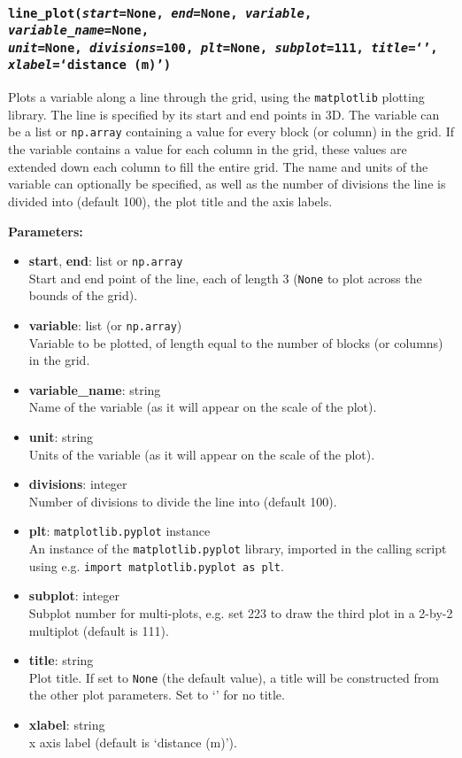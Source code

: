 \subsubsection{\texttt{line\_plot(\emph{start}=None, \emph{end}=None, \emph{variable}, \emph{variable\_name}=None,\\
\emph{unit}=None, \emph{divisions}=100, \emph{plt}=None, \emph{subplot}=111, \emph{title}=`',\\
\emph{xlabel}=`distance (m)')}}

Plots a variable along a line through the grid, using the \texttt{matplotlib} plotting library. The line is specified by its start and end points in 3D.  The variable can be a list or \texttt{np.array} containing a value for every block (or column) in the grid.  If the variable contains a value for each column in the grid, these values are extended down each column to fill the entire grid.  The name and units of the variable can optionally be specified, as well as the number of divisions the line is divided into (default 100), the plot title and the axis labels.

\textbf{Parameters:}
\begin{itemize}
\item \textbf{start}, \textbf{end}: list or \texttt{np.array}\\
  Start and end point of the line, each of length 3 (\texttt{None} to plot across the bounds of the grid).
\item \textbf{variable}: list (or \texttt{np.array})\\
  Variable to be plotted, of length equal to the number of blocks (or columns) in the grid.
\item \textbf{variable\_name}: string\\
  Name of the variable (as it will appear on the scale of the plot).
\item \textbf{unit}: string\\
  Units of the variable (as it will appear on the scale of the plot).
\item \textbf{divisions}: integer\\
  Number of divisions to divide the line into (default 100).
\item \textbf{plt}: \texttt{matplotlib.pyplot} instance\\
  An instance of the \texttt{matplotlib.pyplot} library, imported in the calling script using e.g. \texttt{import matplotlib.pyplot as plt}.
\item \textbf{subplot}: integer\\
  Subplot number for multi-plots, e.g. set 223 to draw the third plot in a 2-by-2 multiplot (default is 111).
\item \textbf{title}: string\\
  Plot title.  If set to \texttt{None} (the default value), a title will be constructed from the other plot parameters.  Set to `' for no title.
\item \textbf{xlabel}: string\\
  x axis label (default is `distance (m)').
\end{itemize}

